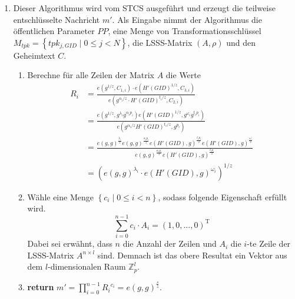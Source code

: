 \begin{enumerate}
	\item {} Dieser Algorithmus
		wird vom STCS ausgeführt und erzeugt die teilweise entschlüsselte Nachricht
		$m'$. Als Eingabe nimmt der Algorithmus die öffentlichen Parameter $PP$,
		eine Menge von Transformationsschlüssel $M_{tpk} = \left\{tpk_{j, GID}
		\;\vert\; 0 \leq j < N\right\}$, die LSSS-Matrix $\left(A, \rho\right)$ und
		den Geheimtext $C$.
		\begin{enumerate}
			\item Berechne für alle Zeilen der Matrix $A$ die Werte
				\begin{align*}
					R_i &= \frac{e(g^{1/z}, C_{1,i}) \cdot e(H'(GID)^{1/z},
					C_{3,i})}{e(g^{\alpha_i / z} \cdot H'(GID)^{t_i/z}, C_{2, i})} \\
							&= \frac{e(g^{1/z}, g^{\lambda_i}g^{\alpha_i p_i}) e(H'(GID)^{1/z},
							g^{\omega_i}g^{t_i p_i})}{e(g^{\alpha_i / z} H'(GID)^{t_i / z},
						g^{p_i})} \\
							&= \frac{e(g, g)^{\frac{\lambda_i}{z}}e(g,g)^{\frac{\alpha_i
							p_i}{z}} e(H'(GID), g)^{\frac{t_i p_i}{z}} e(H'(GID),
						g)^{\frac{\omega_i}{z}}}{e(g,g)^{\frac{\alpha_i p_i}{z}} e(H'(GID),
					g)^{\frac{t_i p_i}{z}}}\\
							&= (e(g,g)^{\lambda_i} \cdot e(H'(GID), g)^{\omega_i})^{1/z}
				\end{align*}
			\item Wähle eine Menge $\left\{c_i \;\vert\; 0 \leq i < n\right\}$, sodass
				folgende Eigenschaft erfüllt wird.
				\begin{equation*}
					\sum_{i=0}^{n-1} c_i \cdot A_i = \left(1, 0, ..., 0\right)^\mathrm{T}
				\end{equation*}
				Dabei sei erwähnt, dass $n$ die Anzahl der Zeilen und $A_i$ die $i$-te
				Zeile der LSSS-Matrix $A^{n \times l}$ sind. Demnach ist das obere
				Resultat ein Vektor aus dem $l$-dimensionalen Raum $\mathbb{Z}_p^l$.
			\item \textbf{return} $m' = \prod\limits_{i=0}^{n-1} {R_i}^{c_i} = e(g,
				g)^{\frac{s}{z}}$.
		\end{enumerate}


\end{enumerate}
